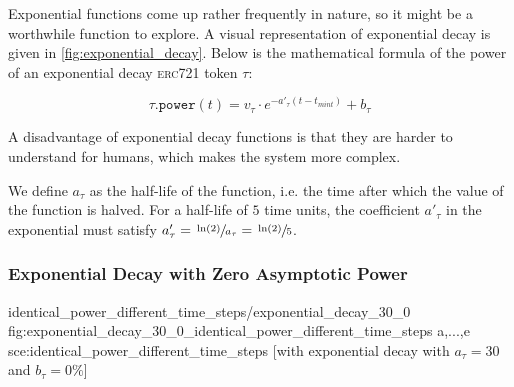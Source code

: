 \leavevmode{}%
Exponential functions come up rather frequently in nature, so it might be a worthwhile function to explore.
A visual representation of exponential decay is given in \cref{fig:exponential_decay}.
Below is the mathematical formula of the power of an exponential decay \textsc{erc721} token $\tau$:

\begin{equation}
  \label{eqn:power_of_exponential_decay_erc721}
  \tau\mathtt{.power}(t) = v_\tau \cdot e^{-a'_\tau (t - t_{mint})} + b_\tau
\end{equation}

A disadvantage of exponential decay functions is that they are harder to understand for humans, which makes the system more complex.

We define $a_\tau$ as the half-life of the function, i.e. the time after which the value of the function is halved.
For a half-life of $5$ time units, the coefficient $a'_\tau$ in the exponential must satisfy $a'_\tau = \sfrac{\ln(2)}{a_\tau} = \sfrac{\ln(2)}{5}$.

\subsubsection{Exponential Decay with Zero Asymptotic Power}

\printPowerFunctionGraphs%
  {identical_power_different_time_steps/exponential_decay_30_0}
  {fig:exponential_decay_30_0_identical_power_different_time_steps}
  {a,...,e}
  {sce:identical_power_different_time_steps}
  [with exponential decay with $a_\tau=30$ and $b_\tau=0\%$]


